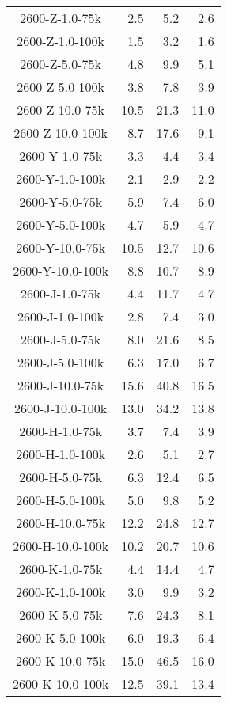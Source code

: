 \begin{longtable}{crrr}
    2600-Z-1.0-75k &   2.5 &    5.2 &   2.6 \\
    2600-Z-1.0-100k &   1.5 &    3.2 &   1.6 \\
    2600-Z-5.0-75k &   4.8 &    9.9 &   5.1 \\
    2600-Z-5.0-100k &   3.8 &    7.8 &   3.9 \\
    2600-Z-10.0-75k &  10.5 &   21.3 &  11.0 \\
    2600-Z-10.0-100k &   8.7 &   17.6 &   9.1 \\
    2600-Y-1.0-75k &   3.3 &    4.4 &   3.4 \\
    2600-Y-1.0-100k &   2.1 &    2.9 &   2.2 \\
    2600-Y-5.0-75k &   5.9 &    7.4 &   6.0 \\
    2600-Y-5.0-100k &   4.7 &    5.9 &   4.7 \\
    2600-Y-10.0-75k &  10.5 &   12.7 &  10.6 \\
    2600-Y-10.0-100k &   8.8 &   10.7 &   8.9 \\
    2600-J-1.0-75k &   4.4 &   11.7 &   4.7 \\
    2600-J-1.0-100k &   2.8 &    7.4 &   3.0 \\
    2600-J-5.0-75k &   8.0 &   21.6 &   8.5 \\
    2600-J-5.0-100k &   6.3 &   17.0 &   6.7 \\
    2600-J-10.0-75k &  15.6 &   40.8 &  16.5 \\
    2600-J-10.0-100k &  13.0 &   34.2 &  13.8 \\
    2600-H-1.0-75k &   3.7 &    7.4 &   3.9 \\
    2600-H-1.0-100k &   2.6 &    5.1 &   2.7 \\
    2600-H-5.0-75k &   6.3 &   12.4 &   6.5 \\
    2600-H-5.0-100k &   5.0 &    9.8 &   5.2 \\
    2600-H-10.0-75k &  12.2 &   24.8 &  12.7 \\
    2600-H-10.0-100k &  10.2 &   20.7 &  10.6 \\
    2600-K-1.0-75k &   4.4 &   14.4 &   4.7 \\
    2600-K-1.0-100k &   3.0 &    9.9 &   3.2 \\
    2600-K-5.0-75k &   7.6 &   24.3 &   8.1 \\
    2600-K-5.0-100k &   6.0 &   19.3 &   6.4 \\
    2600-K-10.0-75k &  15.0 &   46.5 &  16.0 \\
    2600-K-10.0-100k &  12.5 &   39.1 &  13.4 \\

\end{longtable}

